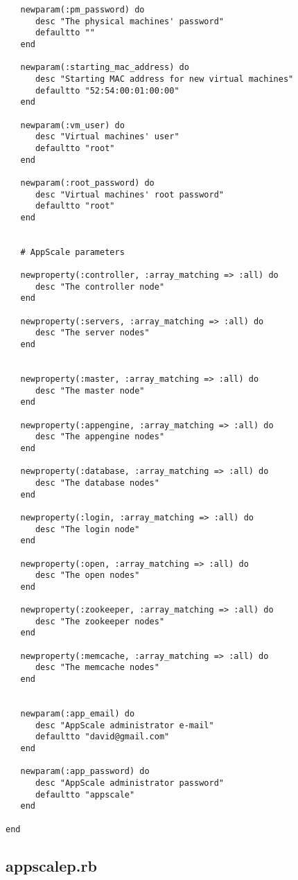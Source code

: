 \begin{lstlisting}
   newparam(:pm_password) do
      desc "The physical machines' password"
      defaultto ""
   end

   newparam(:starting_mac_address) do
      desc "Starting MAC address for new virtual machines"
      defaultto "52:54:00:01:00:00"
   end

   newparam(:vm_user) do
      desc "Virtual machines' user"
      defaultto "root"
   end

   newparam(:root_password) do
      desc "Virtual machines' root password"
      defaultto "root"
   end
   
   
   # AppScale parameters
   
   newproperty(:controller, :array_matching => :all) do
      desc "The controller node"
   end

   newproperty(:servers, :array_matching => :all) do
      desc "The server nodes"
   end


   newproperty(:master, :array_matching => :all) do
      desc "The master node"
   end

   newproperty(:appengine, :array_matching => :all) do
      desc "The appengine nodes"
   end

   newproperty(:database, :array_matching => :all) do
      desc "The database nodes"
   end

   newproperty(:login, :array_matching => :all) do
      desc "The login node"
   end

   newproperty(:open, :array_matching => :all) do
      desc "The open nodes"
   end

   newproperty(:zookeeper, :array_matching => :all) do
      desc "The zookeeper nodes"
   end

   newproperty(:memcache, :array_matching => :all) do
      desc "The memcache nodes"
   end


   newparam(:app_email) do
      desc "AppScale administrator e-mail"
      defaultto "david@gmail.com"
   end
   
   newparam(:app_password) do
      desc "AppScale administrator password"
      defaultto "appscale"
   end
   
end
\end{lstlisting}


\subsection{appscalep.rb}


